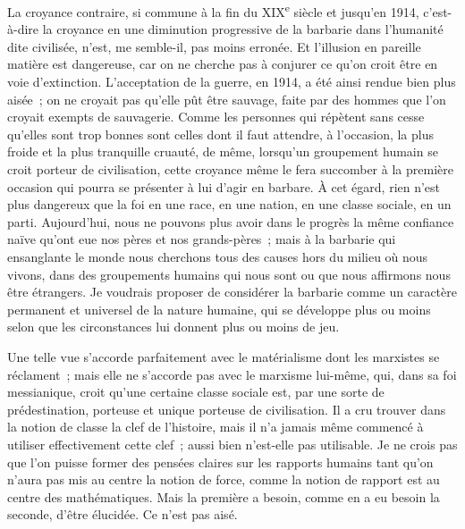 \documentclass[french,twoside]{book} %
\begin{document}
La croyance contraire, si commune à la fin du XIX\textsuperscript{e} siècle et jusqu'en 1914, c'est-à-dire la croyance en une diminution progressive de la barbarie dans l'humanité dite civilisée, n'est, me semble-il, pas moins erronée. Et l'illusion en pareille matière est dangereuse, car on ne cherche pas à conjurer ce qu'on croit être en voie d'extinction. L'acceptation de la guerre, en 1914, a été ainsi rendue bien plus aisée ; on ne croyait pas qu'elle pût être sauvage, faite par des hommes que l'on croyait exempts de sauvagerie. Comme les personnes qui répètent sans cesse qu'elles sont trop bonnes sont celles dont il faut attendre, à l'occasion, la plus froide et la plus tranquille cruauté, de même, lorsqu'un groupement humain se croit porteur de civilisation, cette croyance même le fera succomber à la première occasion qui pourra se présenter à lui d'agir en barbare. À cet égard, rien n'est plus dangereux que la foi en une race, en une nation, en une classe sociale, en un parti. Aujourd'hui, nous ne pouvons plus avoir dans le progrès la même confiance naïve qu'ont eue nos pères et nos grands-pères ; mais à la barbarie qui ensanglante le monde nous cherchons tous des causes hors du milieu où nous vivons, dans des groupements humains qui nous sont ou que nous affirmons nous être étrangers. Je voudrais proposer de considérer la barbarie comme un caractère permanent et universel de la nature humaine, qui se développe plus ou moins selon que les circonstances lui donnent plus ou moins de jeu.\par
Une telle vue s'accorde parfaitement avec le matérialisme dont les marxistes se réclament ; mais elle ne s'accorde pas avec le marxisme lui-mê­me, qui, dans sa foi messianique, croit qu'une certaine classe sociale est, par une sorte de prédestination, porteuse et unique porteuse de civilisation. Il a cru trouver dans la notion de classe la clef de l'histoire, mais il n'a jamais même commencé à utiliser effectivement cette clef ; aussi bien n'est-elle pas utili­sable. Je ne crois pas que l'on puisse former des pensées claires sur les rapports humains tant qu'on n'aura pas mis au centre la notion de force, comme la notion de rapport est au centre des mathématiques. Mais la première a besoin, comme en a eu besoin la seconde, d'être élucidée. Ce n'est pas aisé.\par
\end{document}
